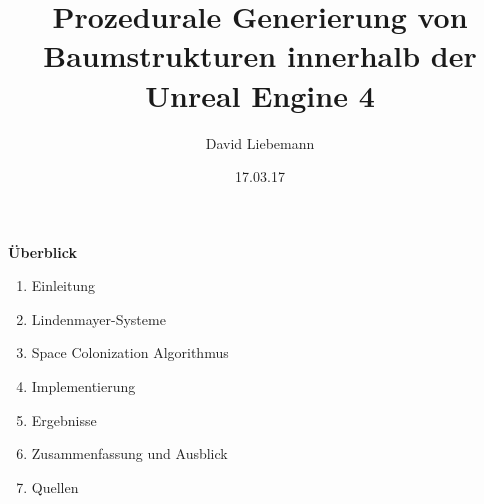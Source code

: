 \documentclass[20pt,landscape]{extarticle}
\title{Prozedurale Generierung von Baumstrukturen innerhalb der Unreal Engine 4}
\author{David Liebemann}
\date{17.03.17}
\begin{document}
\mytitlepage

\newpage
\noindent
{\Large \textbf{Überblick}} 
\slidetitle{}
\begin{enumerate}
	\item Einleitung 
	\item Lindenmayer-Systeme
	\item Space Colonization Algorithmus
	\item Implementierung
	\item Ergebnisse
	\item Zusammenfassung und Ausblick
	\item Quellen
\end{enumerate}










\end{document}
